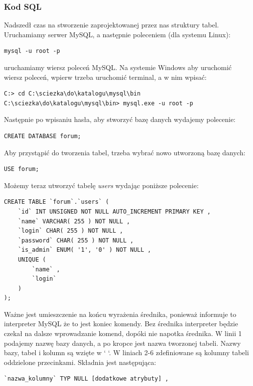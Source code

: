 \documentclass[a4paper,10pt]{article}
\begin{document}
\subsubsection{Kod SQL}
Nadszedł czas na stworzenie zaprojektowanej przez nas struktury tabel. Uruchamiamy serwer MySQL, a następnie poleceniem (dla systemu Linux): \\
\begin{verbatim}
mysql -u root -p
\end{verbatim}
uruchamiamy wiersz poleceń MySQL.
Na systemie Windows aby uruchomić wiersz poleceń, wpierw trzeba uruchomić terminal, a w nim wpisać:  \\
\begin{verbatim}
C:> cd C:\sciezka\do\katalogu\mysql\bin
C:\sciezka\do\katalogu\mysql\bin> mysql.exe -u root -p
\end{verbatim}
Następnie po wpisaniu hasła, aby stworzyć bazę danych wydajemy polecenie: \\
\begin{verbatim}
CREATE DATABASE forum;
\end{verbatim}
Aby przystąpić do tworzenia tabel, trzeba wybrać nowo utworzoną bazę danych: \\
\begin{verbatim}
USE forum;
\end{verbatim}
Możemy teraz utworzyć tabelę \textit{users} wydając poniższe polecenie: \\
\begin{verbatim}
CREATE TABLE `forum`.`users` (
	`id` INT UNSIGNED NOT NULL AUTO_INCREMENT PRIMARY KEY ,
	`name` VARCHAR( 255 ) NOT NULL ,
	`login` CHAR( 255 ) NOT NULL ,
	`password` CHAR( 255 ) NOT NULL ,
	`is_admin` ENUM( '1', '0' ) NOT NULL ,
	UNIQUE (
		`name` ,
		`login` 
	)
);
\end{verbatim}
Ważne jest umieszczenie na końcu wyrażenia średnika, ponieważ informuje to interpreter MySQL że to jest koniec komendy. Bez średnika interpreter będzie czekał na dalsze wprowadzanie komend, dopóki nie napotka średnika.
W linii 1 podajemy nazwę bazy danych, a po kropce jest nazwa tworzonej tabeli. Nazwy bazy, tabel i kolumn są wzięte w ` `. W liniach 2-6 zdefiniowane są kolumny tabeli oddzielone przecinkami. Składnia jest następująca: \\
\begin{verbatim}
`nazwa_kolumny` TYP NULL [dodatkowe atrybuty] ,
\end{verbatim}
\end{document}
